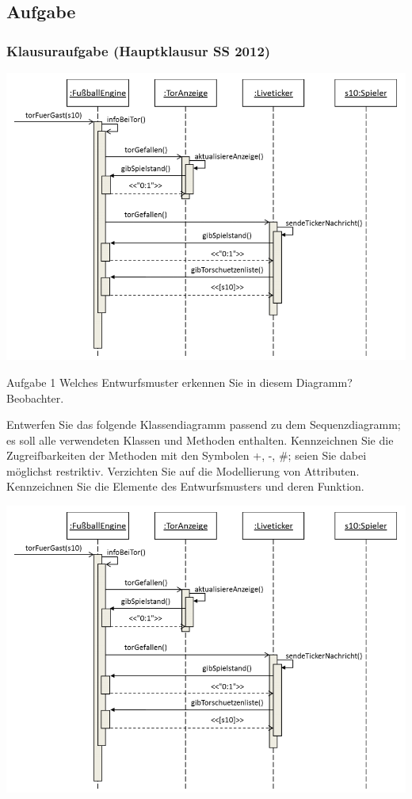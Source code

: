 \documentclass[18pt]{beamer}
\begin{document}
	\subsection{Aufgabe}
	\begin{frame}
		\frametitle{Klausuraufgabe (Hauptklausur SS 2012)}
		\includegraphics[scale=0.35]{./pics/tut3/obs-task.png}	
		\begin{block}{Aufgabe 1}
			Welches Entwurfsmuster erkennen Sie in diesem Diagramm? \pause
			Beobachter.
		\end{block}
	\end{frame}

	\begin{frame}
			\begin{small}
				Entwerfen Sie das folgende Klassendiagramm passend zu dem Sequenzdiagramm; es soll
				alle verwendeten Klassen und Methoden enthalten. Kennzeichnen Sie die Zugreifbarkeiten
				der Methoden mit den Symbolen +, -, \#; seien Sie dabei möglichst restriktiv. Verzichten
				Sie auf die Modellierung von Attributen. Kennzeichnen Sie die Elemente
				des Entwurfsmusters und deren Funktion.
			\end{small}
			\linebreak
			\includegraphics[scale=0.35]{./pics/tut3/obs-task.png}
	\end{frame}
\end{document}
